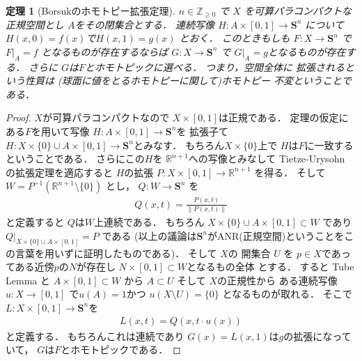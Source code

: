 \documentclass[leqno, a4paper, 12pt]{jsarticle}
\newtheorem{thm}{定理}
\newcommand{\zz}{\mathbb{Z}}
\newcommand{\rr}{\mathbb{R}}
\newcommand{\yosphere}[1]{\mathbf{S}^{#1}}
\numberwithin{equation}{section}
\begin{document}
\begin{thm}[Borsukのホモトピー拡張定理]\label{thm:borsukhomotopy}
$n\in \zz_{\ge 0}$
で
$X$
を可算パラコンパクトな正規空間とし
$A$をその閉集合とする．
連続写像
$H\colon A\times [0, 1]\to \yosphere{n}$
について
$H(x, 0)=f(x)$で$H(x, 1)=g(x)$
とおく．
このときもしも
$F\colon X\to \yosphere{n}$
で
$F|_{A}=f$
となるものが存在するならば
$G\colon X\to \yosphere{n}$
で
$G|_{A}=g$となるものが存在する．
さらに
$G$は$F$とホモトピックに選べる．
つまり，空間全体に
拡張されるという性質は
(球面に値をとるホモトピーに関して)ホモトピー
不変ということである．
\end{thm}
\begin{proof}
$X$が可算パラコンパクトなので
$X\times [0, 1]$は正規である．
定理の仮定にある$F$を用いて写像
$H\colon A\times [0, 1]\to \yosphere{n}$を
拡張子て
$H\colon X\times \{0\}\cup  A\times [0, 1]\to\yosphere{n} $とみなす．
もちろん$X\times \{0\}$上で
$H$は$F$に一致するということである．
さらにこの$H$を
$\rr^{n+1}$への写像とみなして
Tietze-Urysohn
の拡張定理を適応すると
$H$の拡張
$P\colon X\times [0, 1]\to \rr^{n+1}$
を得る．
そして
$W=P^{-1}(\rr^{n+1}\setminus \{0\})$
とし，
$Q\colon W\to \yosphere{n}$
を
\begin{align}
Q(x, t)=\frac{P(x, t)}{\lVert P(x, t)\rVert}
\end{align}
と定義すると
$Q$は$W$上連続である．
もちろん
$X\times \{0\}\cup  A\times [0, 1]\subset W$
であり
$Q|_{X\times \{0\}\cup A\times [0, 1]}=P$
である
(以上の議論は$\yosphere{n}$がANR(正規空間)ということをこの言葉を用いずに証明したものである)．
そして
$X$の
開集合
$U$
を
$p\in X$であってある近傍$p$の$N$が存在し
$N\times [0, 1]\subset W$となるもの全体
とする．
すると
Tube Lemma 
と
$A\times [0, 1]\subset W$
から
$A\subset U$
そして
$X$の正規性から
ある連続写像
$u\colon X\to [0, 1]$
で$u(A)=1$かつ
$u(X\setminus U)=\{0\}$
となるものが取れる．
そこで
$L\colon X\times [0, 1]\to \yosphere{n}$を
\begin{align}
L(x, t)=
Q(x,  t\cdot u(x))
\end{align}
と定義する．
もちろんこれは連続であり
$G(x)=L(x, 1)$は$g$の拡張になっていて，
$G$は$F$とホモトピックである．
\end{proof}
\end{document}
